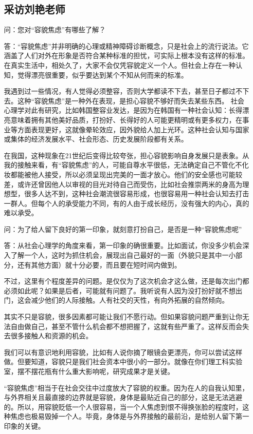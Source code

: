 \subsection{采访刘艳老师}
问：您对``容貌焦虑''有哪些了解？

答：``容貌焦虑''并非明确的心理或精神障碍诊断概念，只是社会上的流行说法。它涵盖了人们对外在形象是否符合某种标准的担忧，可实际上根本没有这样的标准。在真实生活中，相处久了，大家不会仅凭容貌定义一个人。但社会上存在一种认知，觉得漂亮很重要，似乎要达到某个不知从何而来的标准。

我遇到过一些情况，有人觉得必须整容，否则大学都读不下去，甚至日子都过不下去。这种``容貌焦虑''是一种外在表现，是担心容貌不够好而失去某些东西。
社会心理学对此有研究，比如韩国整容业发达，是因为在韩国有一种社会认知：长得漂亮意味着拥有其他美好品质，打扮好、长得好的人可能更精明或有更多权力，在事业等方面表现更好，这就像晕轮效应，因外貌给人加上光环。这种社会认知与国家或集体的经济发展水平、社会形态、历史发展阶段都有关系。

在我国，这种现象在21世纪后变得比较夸张，担心容貌影响自身发展只是表象。从我的接触来看，有``容貌焦虑''的人，可能自尊水平很低，无法确定自己不管化不化妆都能被他人接受，所以必须呈现出完美的一面才放心。他们的安全感也可能较差，或许还曾因他人以审视的目光对待自己而受伤，比如社会推崇两米的身高为理想型，很多人达不到，这种社会潮流很容易形成，也很容易用一种社会认知去打击一群人。但每个人的承受能力不同，有的人由于成长经历，没有强大的内心，真的难以承受。


问：为了给人留下良好的第一印象，就刻意打扮自己，是否是一种``容貌焦虑呢''

答：从社会心理学的角度来看，第一印象的确很重要。比如面试，你没多少机会深入了解一个人，这时为抓住机会，展现出自己最好的一面（外貌只是其中一小部分，还有其他方面）就十分必要，而且要在短时间内做到。

不过，这里有个程度差异的问题。是仅仅为了这次机会才这么做，还是每次出门都必须如此呢？如果是后者，可能就有问题了。我听说有人因为没打扮好就不想出门，这会减少他们的人际接触。人有社交的天性，有向外拓展的自然倾向。

其实不只是容貌，很多因素都可能让我们不愿行动。但如果容貌问题严重到让你无法自由做自己，甚至不管什么机会都不想把握了，这就有些严重了。这样反而会失去很多接触人和资源的机会。

我们可以有意识地利用容貌，比如有人说你摘了眼镜会更漂亮，你可以尝试这样做。但要知道，容貌只是我们社会资本中很小的一部分。就像在你们理工科实验室，摆不摆花瓶有什么重大影响呢，研究成果才是关键。

``容貌焦虑''相当于在社会交往中过度放大了容貌的权重。因为在人的自我认知里，与外界相关且最直接的边界就是容貌，身体是最贴近自己的部分，这是无法逃避的。所以，用容貌贬低一个人很容易，当一个人焦虑到恨不得换张脸的程度时，这种焦虑也极易毁掉一个人。毕竟，身体是与外界接触的最前沿，是给别人留下第一印象的关键。


